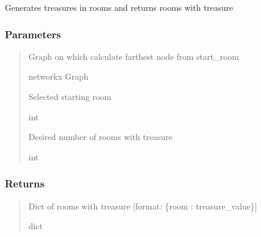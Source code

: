 \documentclass[letterpaper,10pt,english]{sphinxmanual}
\begin{document}

\begin{fulllineitems}
\label{\detokenize{api_reference/dungeon_resolver/generate_dungeon_problem:generate_dungeon_problem.generate_treasures}}
\pysigstartsignatures
{}
\pysigstopsignatures
\sphinxAtStartPar
Generates treasures in rooms and returns rooms with treasure


\subsubsection{Parameters}
\label{\detokenize{api_reference/dungeon_resolver/generate_dungeon_problem:id11}}\begin{quote}\begin{description}
\sphinxAtStartPar
Graph on which calculate farthest node from start\_room

\sphinxAtStartPar
networkx Graph

\sphinxAtStartPar
Selected starting room

\sphinxAtStartPar
int

\sphinxAtStartPar
Desired number of rooms with treasure

\sphinxAtStartPar
int

\end{description}\end{quote}


\subsubsection{Returns}
\label{\detokenize{api_reference/dungeon_resolver/generate_dungeon_problem:id12}}\begin{quote}\begin{description}
\sphinxAtStartPar
Dict of rooms with treasure {[}format: \{room : treasure\_value\}{]}

\sphinxAtStartPar
dict

\end{description}\end{quote}

\end{fulllineitems}
\end{document}
